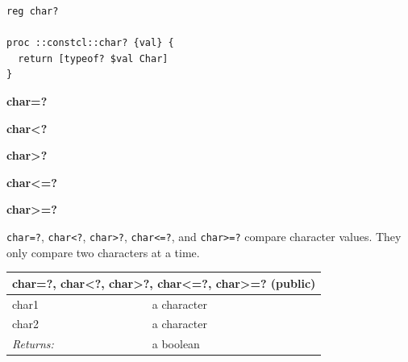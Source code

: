\documentclass[twoside,9pt]{report}
\begin{document}
\noindent\makebox[\linewidth]{\rule{\linewidth}{0.4pt}}
\begin{lstlisting}
reg char?
 
proc ::constcl::char? {val} {
  return [typeof? $val Char]
}
\end{lstlisting}
\noindent\makebox[\linewidth]{\rule{\linewidth}{0.4pt}}

\textbf{char=?}


\textbf{char<?}


\textbf{char>?}


\textbf{char<=?}


\textbf{char>=?}


\texttt{char=?}, \texttt{char<?}, \texttt{char>?}, \texttt{char<=?}, and \texttt{char>=?} compare character values. They only compare two characters at a time.

\begin{tabular}{ |l l| }
\hline
\multicolumn{2}{|l|}{char=?, char<?, char>?, char<=?, char>=? (public)} \\
\hline
char1 & a character \\
char2 & a character \\
\textit{Returns:} & a boolean \\
\hline
\end{tabular}
\end{document}
